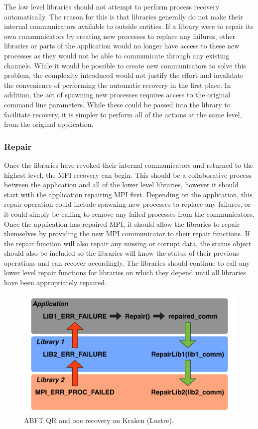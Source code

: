 The low level libraries should not attempt to perform process recovery 
automatically. The reason for this is that libraries generally do not make their 
internal communicators available to outside entities. If a library were to 
repair its own communicators by creating new processes to replace any failures, 
other libraries or parts of the application would no longer have access to these 
new processes as they would not be able to communicate through any existing 
channels. While it would be possible to create new communicators to solve this 
problem, the complexity introduced would not justify the effort and invalidate the 
convenience of performing the automatic recovery in the first place. In addition, 
the act of spawning new processes requires access to the original command line 
parameters. While these could be passed into the library to facilitate recovery, 
it is simpler to perform all of the actions at the same level, from the 
original application.

\subsubsection{Repair}

Once the libraries have revoked their internal communicators and returned to the 
highest level, the MPI recovery can begin. This should be a collaborative 
process between the application and all of the lower level libraries, however it 
should start with the application repairing MPI first. Depending on the 
application, this repair operation could include spawning new processes to 
replace any failures, or it could simply be calling  
to remove any failed processes from the communicators. Once the application has 
repaired MPI, it should allow the libraries to repair themselves by providing 
the new MPI communicator to their repair functions. If the repair function will 
also repair any missing or corrupt data, the status object should also be 
included so the libraries will know the status of their previous operations and 
can recover accordingly. The libraries should continue to call any lower level 
repair functions for libraries on which they depend until all libraries have 
been appropriately repaired.

\begin{figure}
    \centering
    \includegraphics[width=\linewidth]{figures/libraries}
    \caption{ABFT QR and one \cof recovery on Kraken (Lustre).}    	\label{fig:apps:library-repair}	
\end{figure}

